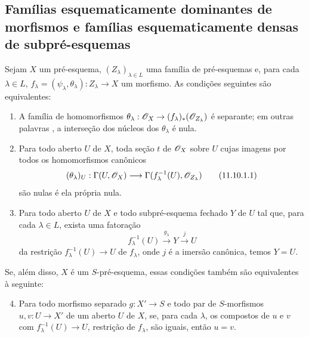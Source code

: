 
\subsection{Famílias esquematicamente dominantes de morfismos e famílias
esquematicamente densas de subpré-esquemas}
\label{subsection:IV.11.10}

\begin{proposition}[11.10.1]
\label{IV.11.10.1}
Sejam $X$ um
pré-esquema,
$(Z_\lambda)_{\lambda\in L}$
uma família de
pré-esquemas e,
para cada
$\lambda\in L$,
$f_\lambda=
(\psi_\lambda,
\theta_\lambda):
Z_\lambda\to X$
um morfismo.
As condições
seguintes são
equivalentes:
\begin{enumerate}[label=\emph{\alph*)}]
\item A família de
homomorfismos
$\theta_\lambda:
\sh{O}_X\to
(f_\lambda)_*
(\sh{O}_{Z_\lambda})$
é separante; em
outras palavras
,
a interseção dos
núcleos dos
$\theta_\lambda$
é nula.
\item Para todo
aberto $U$ de $X$,
toda seção $t$
de $\mathscr{O}_X$
sobre $U$ cujas
imagens por todos
os homomorfismos
canônicos
\begin{equation}
(\theta_\lambda)_U:
\Gamma(U,\sh{O}_X)
\longrightarrow
\Gamma(f_\lambda^{-1}(U),
\sh{O}_{Z_\lambda})
\label{IV.11.10.1.1}
\tag{11.10.1.1}
\end{equation}
são nulas é ela
própria nula.
\item Para todo
aberto $U$ de $X$
e todo
subpré-esquema
fechado $Y$ de $U$
tal que, para cada
$\lambda\in L$,
exista uma fatoração
\begin{equation}
f_\lambda^{-1}(U)
\xrightarrow{g_\lambda}
Y\xrightarrow{j}U
\label{IV.11.10.1.2}
\tag{11.10.1.2}
\end{equation}
da restrição
$f_\lambda^{-1}(U)
\to U$ de
$f_\lambda$, onde
$j$ é a imersão
canônica, temos
$Y=U$.
\end{enumerate}

Se, além disso,
$X$ é um
$S$-pré-esquema,
essas condições
também são
equivalentes à
seguinte:
\begin{enumerate}[label=\emph{\alph*)}]
\setcounter{enumi}{3}
\item Para todo
morfismo separado
$g:X'\to S$ e
todo par de
$S$-morfismos
$u,v:U\to X'$
de um aberto
$U$ de $X$,
se, para cada
$\lambda$, os
compostos de
$u$ e $v$ com
$f_\lambda^{-1}(U)
\to U$, restrição
de $f_\lambda$,
são iguais,
então $u=v$.
\end{enumerate}
\end{proposition}

